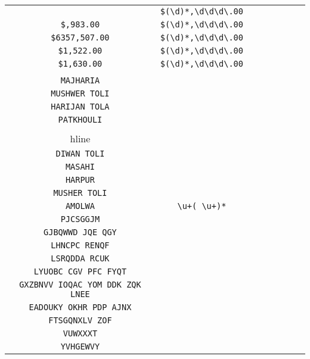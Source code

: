 \begin{longtable}{cccccccc}
\begin{tabular}{ll}
    \verb|$59,948.00| & \verb|$(\d)*,\d\d\d\.00|\\
\verb|$,983.00| & \verb|$(\d)*,\d\d\d\.00|\\
\verb|$6357,507.00| & \verb|$(\d)*,\d\d\d\.00|\\
\verb|$1,522.00| & \verb|$(\d)*,\d\d\d\.00|\\
\verb|$1,630.00| & \verb|$(\d)*,\d\d\d\.00|
\end{tabular}
\\\midrule 
\begin{tabular}{l}
    \verb|HARIJAN TOLI|\\
\verb|MAJHARIA|\\
\verb|MUSHWER TOLI|\\
\verb|HARIJAN TOLA|\\
\verb|PATKHOULI|\\
\\hline\\
\verb|DIWAN TOLI|\\
\verb|MASAHI|\\
\verb|HARPUR|\\
\verb|MUSHER TOLI|\\
\verb|AMOLWA|
\end{tabular}

&
\verb|\u+( \u+)*|
&

\begin{tabular}{l}
    \verb|\u\u\u\u\u\u((\u)* \u\u\u)*(\u)*|\\
\verb|PJCSGGJM|\\
\verb|GJBQWWD JQE QGY|\\
\verb|LHNCPC RENQF|\\
\verb|LSRQDDA RCUK|\\
\verb|LYUOBC CGV PFC FYQT|
\end{tabular}

&

\begin{tabular}{l}
    \verb|\u\u\u\u((\u)*\u\u\u )*(\u)*\u\u\u|\\
\verb|GXZBNVV IOQAC YOM DDK ZQK LNEE|\\
\verb|EADOUKY OKHR PDP AJNX|\\
\verb|FTSGQNXLV ZOF|\\
\verb|VUWXXXT|\\
\verb|YVHGEWVY|
\end{tabular}

&


\end{longtable}
